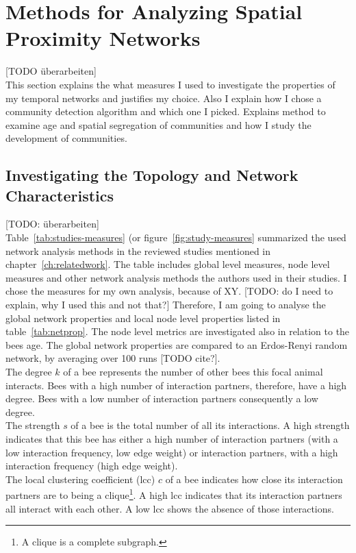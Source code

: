 \section{Methods for Analyzing Spatial Proximity Networks}
[TODO überarbeiten]\\
This section explains the what measures I used to investigate the properties of my temporal networks and justifies my choice. Also I explain how I chose a community detection algorithm and which one I picked. Explains method to examine age and spatial segregation of communities and how I study the development of communities.

\subsection{Investigating the Topology and Network Characteristics}
\label{subsec:APmeasures}
[TODO: überarbeiten]\\
Table~\ref{tab:studies-measures} (or figure~\ref{fig:study-measures} summarized the used network analysis methods in the reviewed studies mentioned in chapter~\ref{ch:relatedwork}. The table includes global level measures, node level measures and other network analysis methods the authors used in their studies.
I chose the measures for my own analysis, because of XY.
[TODO: do I need to explain, why I used this and not that?]
Therefore, I am going to analyse the global network properties and local node level properties listed in table~\ref{tab:netprop}.
The node level metrics are investigated also in relation to the bees age.
The global network properties are compared to an Erdos-Renyi random network, by averaging over 100 runs [TODO cite?].\\

The degree $k$ of a bee represents the number of other bees this focal animal interacts.
Bees with a high number of interaction partners, therefore, have a high degree. Bees with a low number of interaction partners consequently a low degree.\\
The strength $s$ of a bee is the total number of all its interactions. A high strength indicates that this bee has either a high number of interaction partners (with a low interaction frequency, low edge weight) or interaction partners, with a high interaction frequency (high edge weight).\\
The local clustering coefficient (lcc) $c$ of a bee indicates how close its interaction partners are to being a clique\footnote{A clique is a complete subgraph.}. A high lcc indicates that its interaction partners all interact with each other. A low lcc shows the absence of those interactions.

